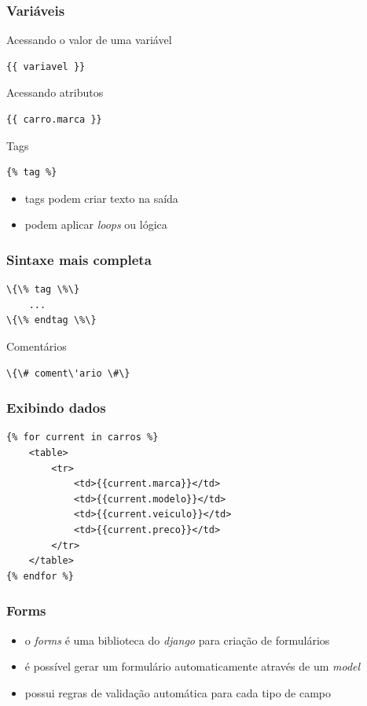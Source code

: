 \documentclass[aspectratio=169]{beamer}
\begin{document}
\begin{frame}[fragile]\frametitle{Vari\'aveis}
Acessando o valor de uma vari\'avel

\begin{verbatim}
{{ variavel }}
\end{verbatim}

Acessando atributos

\begin{verbatim}
{{ carro.marca }}
\end{verbatim}

Tags

\begin{verbatim}
{% tag %}
\end{verbatim}

\begin{itemize}
 	\item tags podem criar texto na sa\'ida
 	\item podem aplicar \emph{loops} ou l\'ogica
\end{itemize}

\end{frame}

\begin{frame}[fragile]\frametitle{Sintaxe mais completa}
\begin{verbatim}
\{\% tag \%\}
	...
\{\% endtag \%\}
\end{verbatim}

Coment\'arios

\begin{verbatim}
\{\# coment\'ario \#\}
\end{verbatim}
\end{frame}


\begin{frame}[fragile]\frametitle{Exibindo dados}
	\begin{verbatim}
{% for current in carros %}
	<table>
		<tr>
			<td>{{current.marca}}</td>
			<td>{{current.modelo}}</td>
			<td>{{current.veiculo}}</td>
			<td>{{current.preco}}</td>
		</tr>
	</table>
{% endfor %}
	\end{verbatim}
\end{frame}

\begin{frame}\frametitle{Forms}
\begin{itemize}
	\item o \emph{forms} \'e uma biblioteca do \emph{django} para cria\c c\~ao de formul\'arios
	\item \'e poss\'ivel gerar um formul\'ario automaticamente atrav\'es de um \emph{model}
	\item possui regras de valida\c c\~ao autom\'atica para cada tipo de campo
\end{itemize}
\end{frame}
\end{document}
